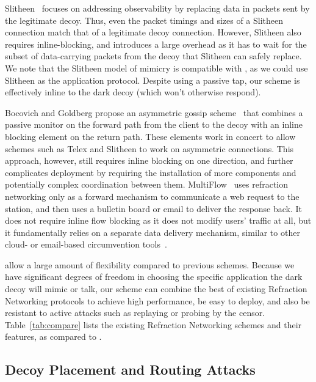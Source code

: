 Slitheen~\cite{slitheen16} focuses on addressing observability by replacing
data in packets sent by the legitimate decoy. Thus, even the packet timings and
sizes of a Slitheen connection match that of a legitimate decoy connection.
However, Slitheen also requires inline-blocking, and introduces a large overhead
as it has to wait for the subset of data-carrying packets from the decoy that
Slitheen can safely replace. We note that the Slitheen model of mimicry is
compatible with \scheme, as we could use Slitheen as the application
protocol. Despite using a passive tap, our scheme is effectively inline to the
dark decoy (which won't otherwise respond).


Bocovich and Goldberg propose an asymmetric gossip scheme~\cite{secureasymmetry} that combines a passive monitor on the forward path from the client to the decoy with an inline blocking element on the return path. These elements work in concert to allow schemes such as Telex and Slitheen to work on asymmetric connections. This approach, however, still requires inline blocking on one direction, and further complicates deployment by requiring the installation of more components and potentially complex coordination between them. MultiFlow~\cite{multiflow} uses refraction networking only as a forward mechanism to communicate a web request to the station, and then uses a bulletin board or email to deliver the response back. It does not require inline flow blocking as it does not modify users' traffic at all, but it fundamentally relies on a separate data delivery mechanism, similar to other cloud- or email-based circumvention tools~\cite{SWEET-ToN,CloudTransport}.

\scheme allow a large amount of flexibility compared to previous schemes.
Because we have significant degrees of freedom in choosing the specific
application the dark decoy will mimic or talk, our scheme can combine the best
of existing Refraction Networking protocols to achieve high performance, be easy
to deploy, and
also be resistant to active attacks such as replaying or probing by the censor.
Table~\ref{tab:compare} lists the existing Refraction Networking schemes and
their features, as compared to \scheme.

\subsection{Decoy Placement and Routing Attacks}

